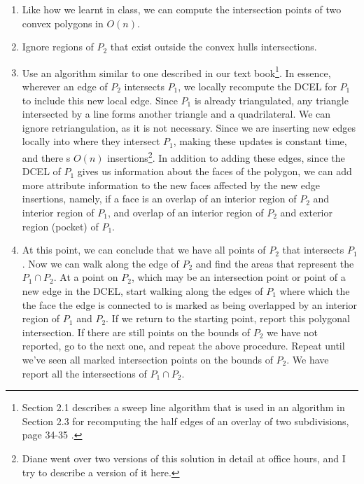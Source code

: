 \documentclass [12pt]{article}
\begin{document}
    \begin{enumerate}
        \item Like how we learnt in class, we can compute the intersection points of two convex polygons in $O(n)$. 
        \item Ignore regions of $P_2$ that exist outside the convex hulls intersections. 
        \item Use an algorithm similar to one described in our text book\footnote{Section 2.1 describes a sweep line algorithm that is used in an algorithm in Section 2.3 for recomputing the half edges of an overlay of two subdivisions, page 34-35 \cite{berg08}.}. In essence, wherever an edge of $P_2$ intersects $P_1$, we locally recompute the DCEL for $P_1$ to include this new local edge. Since $P_1$ is already triangulated, any triangle intersected by a line forms another triangle and a quadrilateral. We can ignore retriangulation, as it is not necessary. Since we are inserting new edges locally into where they intersect $P_1$, making these updates is constant time, and there s $O(n)$ insertions\footnote{Diane went over two versions of this solution in detail at office hours, and I try to describe a version of it here.}. In addition to adding these edges, since the DCEL of $P_1$ gives us information about the faces of the polygon, we can add more attribute information to the new faces affected by the new edge insertions, namely, if a face is an overlap of an interior region of $P_2$ and interior region of $P_1$, and overlap of an interior region of $P_2$ and exterior region (pocket) of $P_1$.
        
        \item At this point, we can conclude that we have all points of $P_2$ that intersects $P_1$. Now we can walk along the edge of $P_2$ and find the areas that represent the $P_1 \cap P_2$. At a point on $P_2$, which may be an intersection point or point of a new edge in the DCEL, start walking along the edges of $P_1$ where which the the face the edge is connected to is marked as being overlapped by an interior region of $P_1$ and $P_2$. If we return to the starting point, report this polygonal intersection. If there are still points on the bounds of $P_2$ we have not reported, go to the next one, and repeat the above procedure. Repeat until we've seen all marked intersection points on the bounds of $P_2$. We have report all the intersections of $P_1 \cap P_2$.
    \end{enumerate}

    
        
\end{document}
